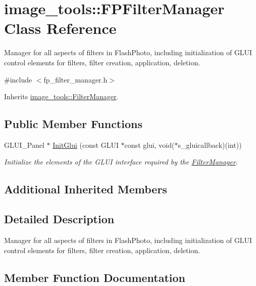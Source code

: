 \hypertarget{classimage__tools_1_1FPFilterManager}{}\section{image\+\_\+tools\+:\+:F\+P\+Filter\+Manager Class Reference}
\label{classimage__tools_1_1FPFilterManager}


Manager for all aspects of filters in Flash\+Photo, including initialization of G\+L\+UI control elements for filters, filter creation, application, deletion.  




{\ttfamily \#include $<$fp\+\_\+filter\+\_\+manager.\+h$>$}



Inherits \hyperlink{classimage__tools_1_1FilterManager}{image\+\_\+tools\+::\+Filter\+Manager}.

\subsection*{Public Member Functions}
\begin{DoxyCompactItemize}
\item 
G\+L\+U\+I\+\_\+\+Panel $\ast$ \hyperlink{classimage__tools_1_1FPFilterManager_ae18492ff9774e634fea8258e31074418}{Init\+Glui} (const G\+L\+UI $\ast$const glui, void($\ast$s\+\_\+gluicallback)(int))
\begin{DoxyCompactList}\small\item\em Initialize the elements of the G\+L\+UI interface required by the \hyperlink{classimage__tools_1_1FilterManager}{Filter\+Manager}. \end{DoxyCompactList}\end{DoxyCompactItemize}
\subsection*{Additional Inherited Members}


\subsection{Detailed Description}
Manager for all aspects of filters in Flash\+Photo, including initialization of G\+L\+UI control elements for filters, filter creation, application, deletion. 

\subsection{Member Function Documentation}
